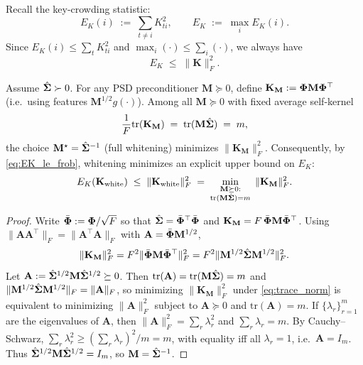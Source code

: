 Recall the key-crowding statistic:
\[
E_{K}(i)\;:=\;\sum_{t\neq i} K_{ti}^2,
\qquad
E_{K}\;:=\;\max_{i} E_{K}(i).
\]
Since $E_{K}(i)\le \sum_{t} K_{ti}^2$ and $\max_{i}(\cdot)\le \sum_{i}(\cdot)$, we always have
\begin{equation}\label{eq:EK_le_frob}
E_{K} \;\le\; \|\mathbf{K}\|_{F}^2 .
\end{equation}

\begin{lemma}
\label{lem:whiten_min_frob}
Assume $\hat{{\bm{\Sigma}}}\succ 0$. For any PSD preconditioner $\mathbf{M}\succeq 0$, define
$\mathbf{K}_{\mathbf{M}} := {\bm{\Phi}} \mathbf{M} {\bm{\Phi}}^\top$ (i.e.\ using features $\mathbf{M}^{1/2}g(\cdot)$).
Among all $\mathbf{M}\succeq 0$ with fixed average self-kernel
\begin{equation}\label{eq:trace_norm}
\frac1F \mathrm{tr}(\mathbf{K}_{\mathbf{M}}) \;=\; \mathrm{tr}(\mathbf{M}\hat{{\bm{\Sigma}}}) \;=\; m ,
\end{equation}
the choice $\mathbf{M}^\star=\hat{{\bm{\Sigma}}}^{-1}$ (full whitening) minimizes $\|\mathbf{K}_{\mathbf{M}}\|_{F}^2$.
Consequently, by \eqref{eq:EK_le_frob}, whitening minimizes an explicit upper bound on $E_{K}$:
\[
E_{K}(\mathbf{K}_{\mathrm{white}})\;\le\;\|\mathbf{K}_{\mathrm{white}}\|_{F}^2
\;=\;\min_{\substack{\mathbf{M}\succeq 0:\\ \mathrm{tr}(\mathbf{M}\hat{{\bm{\Sigma}}})=m}}\;\|\mathbf{K}_{\mathbf{M}}\|_{F}^2 .
\]
\end{lemma}

\begin{proof}
Write $\bar{{\bm{\Phi}}}:={\bm{\Phi}}/\sqrt{F}$ so that $\hat{{\bm{\Sigma}}}=\bar{{\bm{\Phi}}}^\top \bar{{\bm{\Phi}}}$ and
$\mathbf{K}_{\mathbf{M}} = F\,\bar{{\bm{\Phi}}} \mathbf{M} \bar{{\bm{\Phi}}}^\top$.
Using $\|\mathbf{A}\mathbf{A}^\top\|_{F}=\|\mathbf{A}^\top \mathbf{A}\|_{F}$ with $\mathbf{A}=\bar{{\bm{\Phi}}} \mathbf{M}^{1/2}$,
\[
\|\mathbf{K}_{\mathbf{M}}\|_{F}^2
= F^2 \|\bar{{\bm{\Phi}}} \mathbf{M} \bar{{\bm{\Phi}}}^\top\|_{F}^2
= F^2 \|\mathbf{M}^{1/2}\hat{{\bm{\Sigma}}} \mathbf{M}^{1/2}\|_{F}^2.
\]
Let $\mathbf{A} := \hat{{\bm{\Sigma}}}^{1/2} \mathbf{M} \hat{{\bm{\Sigma}}}^{1/2}\succeq 0$. Then
$\mathrm{tr}(\mathbf{A})=\mathrm{tr}(\mathbf{M}\hat{{\bm{\Sigma}}})=m$ and $\|\mathbf{M}^{1/2}\hat{{\bm{\Sigma}}} \mathbf{M}^{1/2}\|_{F}=\|\mathbf{A}\|_{F}$,
so minimizing $\|\mathbf{K}_{\mathbf{M}}\|_{F}^2$ under \eqref{eq:trace_norm} is equivalent to minimizing $\|\mathbf{A}\|_{F}^2$
subject to $\mathbf{A}\succeq 0$ and $\mathrm{tr}(\mathbf{A})=m$.
If $\{\lambda_{r}\}_{r=1}^m$ are the eigenvalues of $\mathbf{A}$, then $\|\mathbf{A}\|_{F}^2=\sum_{r} \lambda_{r}^2$
and $\sum_{r} \lambda_{r}=m$. By Cauchy--Schwarz,
$\sum_{r} \lambda_{r}^2 \ge (\sum_{r} \lambda_{r})^2/m = m$, with equality iff all $\lambda_{r}=1$,
i.e.\ $\mathbf{A}=I_{m}$. Thus $\hat{{\bm{\Sigma}}}^{1/2} \mathbf{M} \hat{{\bm{\Sigma}}}^{1/2}=I_{m}$, so $\mathbf{M}=\hat{{\bm{\Sigma}}}^{-1}$.
\end{proof}

